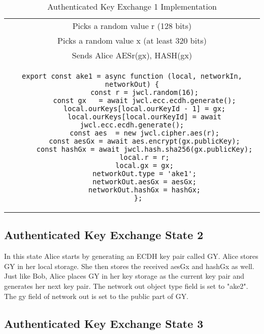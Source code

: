 \begin{table}[!htbp]
\centering
\begin{tabular}{|c|} 
 \hline
 Picks a random value r (128 bits) \\ 
 Picks a random value x (at least 320 bits) \\ 
 Sends Alice AESr(gx), HASH(gx) \\
 \hline 
 \begin{lstlisting}[basicstyle=\small]
 export const ake1 = async function (local, networkIn, networkOut) {
      const r = jwcl.random(16);
      const gx   = await jwcl.ecc.ecdh.generate();
      local.ourKeys[local.ourKeyId - 1] = gx;
      local.ourKeys[local.ourKeyId] = await jwcl.ecc.ecdh.generate();
      const aes  = new jwcl.cipher.aes(r);
      const aesGx = await aes.encrypt(gx.publicKey);
      const hashGx = await jwcl.hash.sha256(gx.publicKey);
      local.r = r;
      local.gx = gx;
      networkOut.type = 'ake1';
      networkOut.aesGx = aesGx;
      networkOut.hashGx = hashGx;
   };
 \end{lstlisting}
  \\
  \hline
\end{tabular}
\caption{Authenticated Key Exchange 1 Implementation}
\label{table:ake1}
\end{table}



\subsection{Authenticated Key Exchange State 2}


In this state Alice starts by generating an ECDH key pair called GY. Alice stores GY in her local storage. She then stores the received aesGx and hashGx as well. Just like Bob, Alice places GY in her key storage as the current key pair and generates her next key pair. The network out object type field is set to "ake2". The gy field of network out is set to the public part of GY.


\subsection{Authenticated Key Exchange State 3}


